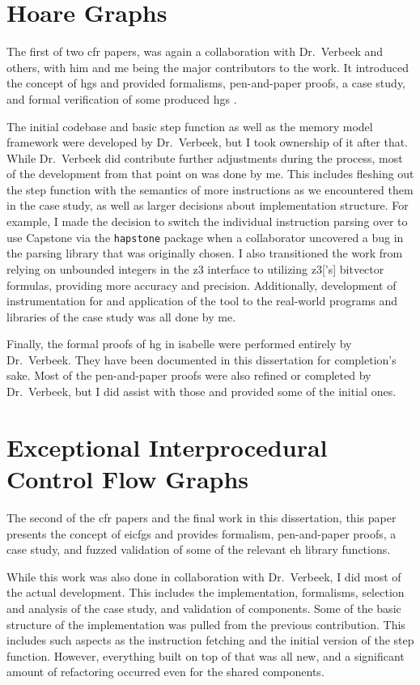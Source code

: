 \section*{Hoare Graphs}
The first of two \gls{cfr} papers,  was again a collaboration with Dr.~Verbeek and others, with him and me being the major contributors to the work.
It introduced the concept of \glspl{hg} and provided formalisms, pen-and-paper proofs, a case study, and formal verification of some produced \glspl{hg} \autocite{verbeek2022lifting}. %

The initial codebase and basic step function as well as the memory model framework were developed by Dr.~Verbeek, but I took ownership of it after that.
While Dr.~Verbeek did contribute further adjustments during the process, most of the development from that point on was done by me.
This includes fleshing out the step function with the semantics of more instructions as we encountered them in the case study, as well as larger decisions about implementation structure.
For example, I made the decision to switch the individual instruction parsing over to use Capstone \autocite{capstone} via the \texttt{hapstone} package \autocite{hapstone} when a collaborator uncovered a bug in the parsing library that was originally chosen.
I also transitioned the work from relying on unbounded integers in the \gls{z3} interface to utilizing \gls{z3}['s] bitvector formulas, providing more accuracy and precision.
Additionally, development of instrumentation for and application of the tool to the real-world programs and libraries of the case study was all done by me.

Finally, the formal proofs of \gls{hg} in \gls{isabelle} were performed entirely by Dr.~Verbeek.
They have been documented in this dissertation for completion's sake.
Most of the pen-and-paper proofs were also refined or completed by Dr.~Verbeek, but I did assist with those and provided some of the initial ones.

\section*{Exceptional Interprocedural Control Flow Graphs}
The second of the \gls{cfr} papers and the final work in this dissertation, this paper presents the concept of \glspl{eicfg} and provides formalism, pen-and-paper proofs, a case study, and fuzzed validation of some of the relevant \gls{eh} library functions.

While this work was also done in collaboration with Dr.~Verbeek, I did most of the actual development.
This includes the implementation, formalisms, selection and analysis of the case study, and validation of components.
Some of the basic structure of the implementation was pulled from the previous contribution.
This includes such aspects as the instruction fetching and the initial version of the step function.
However, everything built on top of that was all new, and a significant amount of refactoring occurred even for the shared components.
